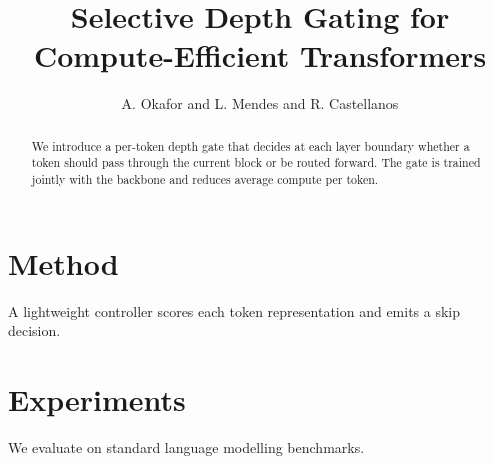 \documentclass{article}
\title{Selective Depth Gating for Compute-Efficient Transformers}
\author{A. Okafor and L. Mendes and R. Castellanos}
\begin{document}
\maketitle
\begin{abstract}
We introduce a per-token depth gate that decides at each layer boundary whether
a token should pass through the current block or be routed forward. The gate is
trained jointly with the backbone and reduces average compute per token.
\end{abstract}
\section{Method}
A lightweight controller scores each token representation and emits a skip decision.
\section{Experiments}
We evaluate on standard language modelling benchmarks.
\end{document}
